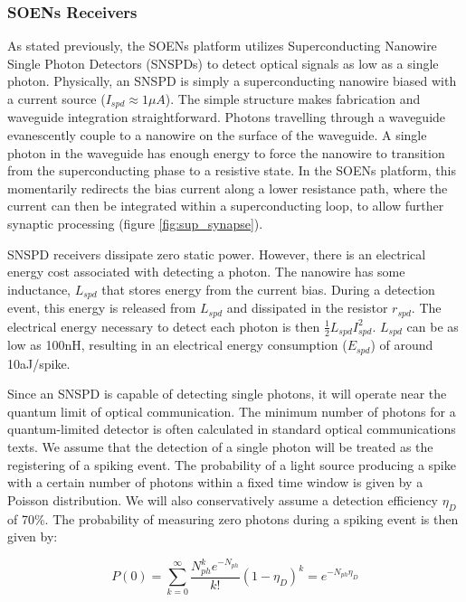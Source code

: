 \documentclass[twocolumn]{article}
\begin{document}
\subsubsection{SOENs Receivers}
As stated previously, the SOENs platform utilizes Superconducting Nanowire Single Photon Detectors (SNSPDs) to detect optical signals as low as a single photon. Physically, an SNSPD is simply a superconducting nanowire biased with a current source ($I_{spd} \approx 1\mu A$). The simple structure makes fabrication and waveguide integration straightforward. Photons travelling through a waveguide evanescently couple to a nanowire on the surface of the waveguide. A single photon in the waveguide has enough energy to force the nanowire to transition from the superconducting phase to a resistive state. In the SOENs platform, this momentarily redirects the bias current along a lower resistance path, where the current can then be integrated within a superconducting loop, to allow further synaptic processing (figure \ref{fig:sup_synapse}).

SNSPD receivers dissipate zero static power. However, there is an electrical energy cost associated with detecting a photon. The nanowire has some inductance, $L_{spd}$ that stores energy from the current bias. During a detection event, this energy is released from $L_{spd}$ and dissipated in the resistor $r_{spd}$. The electrical energy necessary to detect each photon is then $\frac{1}{2}L_{spd}I_{spd}^2$. $L_{spd}$ can be as low as 100nH, resulting in an electrical energy consumption ($E_{spd}$) of around 10aJ/spike.

Since an SNSPD is capable of detecting single photons, it will operate near the quantum limit of optical communication. The minimum number of photons for a quantum-limited detector is often calculated in standard optical communications texts. We assume that the detection of a single photon will be treated as the registering of a spiking event. The probability of a light source producing a spike with a certain number of photons within a fixed time window is given by a Poisson distribution. We will also conservatively assume a detection efficiency $\eta_D$ of 70\%. The probability of measuring zero photons during a spiking event is then given by:

\begin{equation}
    P(0) = \sum_{k=0}^{\infty} \frac{N_{ph}^k e^{-N_{ph}}}{k!}(1-\eta_D)^{k} = e^{-N_{ph}\eta_D}
\label{eq: poisson}
\end{equation}
\end{document}
